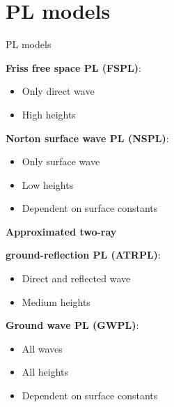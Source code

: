 \documentclass[10pt]{beamer}
\begin{document}
%
\section{PL models}
\begin{frame}{PL models}
\begin{minipage}{.45\textwidth}
\raggedright\textcolor{thomasblue}{\textbf{Friss free space PL (FSPL)}:}
\begin{itemize}
\item Only direct wave
\item High heights
\end{itemize} 
\vspace{1em}
\raggedright\textcolor{thomasgreen}{\textbf{Norton surface wave PL (NSPL)}:}
\begin{itemize}
\item Only surface wave
\item Low heights
\item Dependent on surface constants
\end{itemize}
\end{minipage}%
\hspace{.12\textwidth}
\begin{minipage}{.41\textwidth}
\raggedright\textcolor{thomasred}{\textbf{Approximated two-ray}}\\
\raggedright\textcolor{thomasred}{\textbf{ground-reflection PL (ATRPL)}:}
\begin{itemize}
\item Direct and reflected wave
\item Medium heights
\end{itemize}

\raggedright\textcolor{thomaspurple}{\textbf{Ground wave PL (GWPL)}:}
\begin{itemize}
\item All waves
\item All heights
\item Dependent on surface constants
\end{itemize} 
\end{minipage}%
\end{frame}
\end{document}
